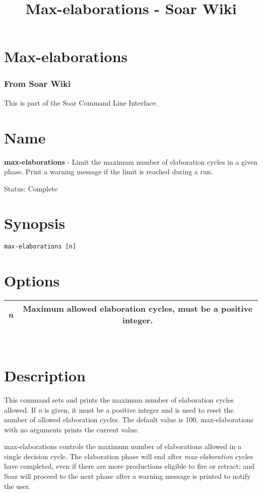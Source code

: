 \documentclass[10pt]{article}
\title{Max-elaborations - Soar Wiki}
\begin{document}
\section*{Max-elaborations}
\subsubsection*{From Soar Wiki}


 This is part of the Soar Command Line Interface. 
\section*{ Name }


 \textbf{max-elaborations}
 - Limit the maximum number of elaboration cycles in a given phase. Print a warning message if the limit is reached during a run. 


 Status: Complete
\section*{ Synopsis }
\begin{verbatim}
max-elaborations [n]

\end{verbatim}
\section*{ Options }


\begin{tabular}{|c|c|}
\hline 
\emph{n}
 & Maximum allowed elaboration cycles, must be a positive integer.  \\
 \hline 

\end{tabular}



 \\ 

\section*{ Description }


 This command sets and prints the maximum number of elaboration cycles allowed. If \emph{n}
 is given, it must be a positive integer and is used to reset the number of allowed elaboration cycles. The default value is 100. max-elaborations with no arguments prints the current value. 


 max-elaborations controls the maximum number of elaborations allowed in a single decision cycle. The elaboration phase will end after \emph{max-elaboration}
 cycles have completed, even if there are more productions eligible to fire or retract; and Soar will proceed to the next phase after a warning message is printed to notify the user. 
\end{document}
